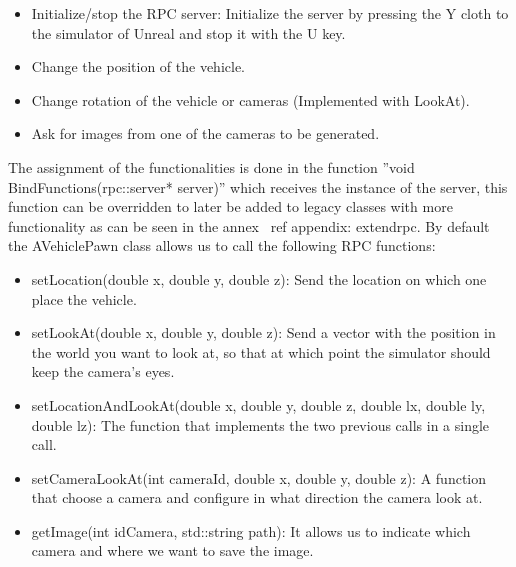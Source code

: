 \documentclass[10pt,a4paper,twocolumn,twoside]{article}
\begin{document}
\begin{itemize}
\item Initialize/stop the RPC server: Initialize the server by pressing the Y cloth to the simulator of Unreal and stop it with the U key.
\item Change the position of the vehicle.
\item Change rotation of the vehicle or cameras (Implemented with LookAt).
\item Ask for images from one of the cameras to be generated.
\end{itemize}

The assignment of the functionalities is done in the function ''void BindFunctions(rpc::server* server)'' which receives the instance of the server, this function can be overridden to later be added to legacy classes with more functionality as can be seen in the annex \ ref {appendix: extendrpc}. By default the AVehiclePawn class allows us to call the following RPC functions:

\begin{itemize}
\item setLocation(double x, double y, double z): Send the location on which one place the vehicle.

\item setLookAt(double x, double y, double z): Send a vector with the position in the world you want to look at, so that at which point the simulator should keep the camera's eyes.

\item setLocationAndLookAt(double x, double y, double z, double lx, double ly, double lz): The function that implements the two previous calls in a single call.

\item setCameraLookAt(int cameraId, double x, double y, double z): A function that choose a camera and configure in what direction the camera look at.

\item getImage(int idCamera, std::string path): It allows us to indicate which camera and where we want to save the image.
\end{itemize}
\end{document}
